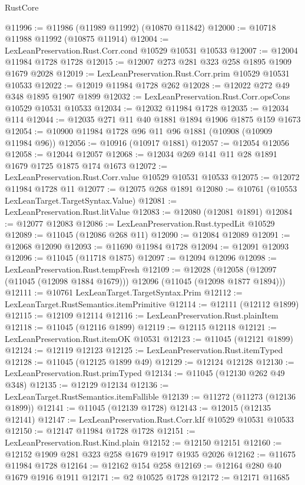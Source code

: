 \begin{lexlean}{RustCore}
\begin{coremodule}
@11996 := @11986 (@11989 @11992) (@10870 @11842)
@12000 := @10718 @11988 @11992 (@10875 @11914)
@12004 := LexLeanPreservation.Rust.Corr.cond @10529 @10531 @10533
@12007 := @12004 @11984 @1728 @1728
@12015 := @12007 @273 @281 @323 @258 @1895 @1909 @1679 @2028
@12019 := LexLeanPreservation.Rust.Corr.prim @10529 @10531 @10533
@12022 := @12019 @11984 @1728 @262
@12028 := @12022 @272 @49 @348 @1895 @1907 @1899
@12032 := LexLeanPreservation.Rust.Corr.opsCons @10529 @10531 @10533
@12034 := @12032 @11984 @1728
@12035 := @12034 @114
@12044 := @12035 @271 @11 @40 @1881 @1894 @1906 @1875 @159 @1673
@12054 := @10900 @11984 @1728 @96 @11 @96 @1881 (@10908 (@10909 @11984 @96))
@12056 := @10916 (@10917 @1881)
@12057 := @12054 @12056
@12058 := @12044 @12057
@12068 := @12034 @269 @141 @11 @28 @1891 @1679 @1725 @1875 @174 @1673
@12072 := LexLeanPreservation.Rust.Corr.value @10529 @10531 @10533
@12075 := @12072 @11984 @1728 @11
@12077 := @12075 @268 @1891
@12080 := @10761 (@10553 LexLeanTarget.TargetSyntax.Value)
@12081 := LexLeanPreservation.Rust.litValue
@12083 := @12080 (@12081 @1891)
@12084 := @12077 @12083
@12086 := LexLeanPreservation.Rust.typedLit @10529
@12089 := @11045 (@12086 @268 @11)
@12090 := @12084 @12089
@12091 := @12068 @12090
@12093 := @11690 @11984 @1728
@12094 := @12091 @12093
@12096 := @11045 (@11718 @1875)
@12097 := @12094 @12096
@12098 := LexLeanPreservation.Rust.tempFresh
@12109 := @12028
    (@12058 (@12097 (@11045 (@12098 @1884 @1679))) @12096 (@11045 (@12098 @1877 @1894)))
@12111 := @10761 LexLeanTarget.TargetSyntax.Prim
@12112 := LexLeanTarget.RustSemantics.itemPrimitive
@12114 := @12111 (@12112 @1899)
@12115 := @12109 @12114
@12116 := LexLeanPreservation.Rust.plainItem
@12118 := @11045 (@12116 @1899)
@12119 := @12115 @12118
@12121 := LexLeanPreservation.Rust.itemOK @10531
@12123 := @11045 (@12121 @1899)
@12124 := @12119 @12123
@12125 := LexLeanPreservation.Rust.itemTyped
@12128 := @11045 (@12125 @1899 @49)
@12129 := @12124 @12128
@12130 := LexLeanPreservation.Rust.primTyped
@12134 := @11045 (@12130 @262 @49 @348)
@12135 := @12129 @12134
@12136 := LexLeanTarget.RustSemantics.itemFallible
@12139 := @11272 (@11273 (@12136 @1899))
@12141 := @11045 (@12139 @1728)
@12143 := @12015 (@12135 @12141)
@12147 := LexLeanPreservation.Rust.Corr.kIf @10529 @10531 @10533
@12150 := @12147 @11984 @1728 @1728
@12151 := LexLeanPreservation.Rust.Kind.plain
@12152 := @12150 @12151
@12160 := @12152 @1909 @281 @323 @258 @1679 @1917 @1935 @2026
@12162 := @11675 @11984 @1728
@12164 := @12162 @154 @258
@12169 := @12164 @280 @40 @1679 @1916 @1911
@12171 := @2 @10525 @1728
@12172 := @12171 @11685

\end{coremodule}
\end{lexlean}
